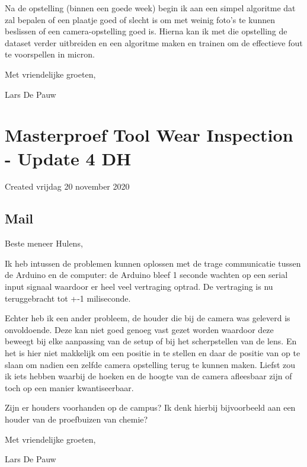 \documentclass{article}
\begin{document}
Na de opstelling (binnen een goede week) begin ik aan een simpel algoritme dat zal bepalen of een plaatje goed of slecht is om met weinig foto’s te kunnen beslissen of een camera-opstelling goed is. Hierna kan ik met die opstelling de dataset verder uitbreiden en een algoritme maken en trainen om de effectieve fout te voorspellen in micron.

 

Met vriendelijke groeten,

 

Lars De Pauw


		\section{Masterproef Tool Wear Inspection - Update 4 DH}

Created vrijdag 20 november 2020



\subsection{Mail}

Beste meneer Hulens,

 

Ik heb intussen de problemen kunnen oplossen met de trage communicatie tussen de Arduino en de computer: de Arduino bleef 1 seconde wachten op een serial input signaal waardoor er heel veel vertraging optrad. De vertraging is nu teruggebracht tot +-1 miliseconde.

 

Echter heb ik een ander probleem, de houder die bij de camera was geleverd is onvoldoende. Deze kan niet goed genoeg vast gezet worden waardoor deze beweegt bij elke aanpassing van de setup of bij het scherpstellen van de lens. En het is hier niet makkelijk om een positie in te stellen en daar de positie van op te slaan om nadien een zelfde camera opstelling terug te kunnen maken. Liefst zou ik iets hebben waarbij de hoeken en de hoogte van de camera afleesbaar zijn of toch op een manier kwantiseerbaar.

 

Zijn er houders voorhanden op de campus? Ik denk hierbij bijvoorbeeld aan een houder van de proefbuizen van chemie?

 

Met vriendelijke groeten,

 

Lars De Pauw
\end{document}
